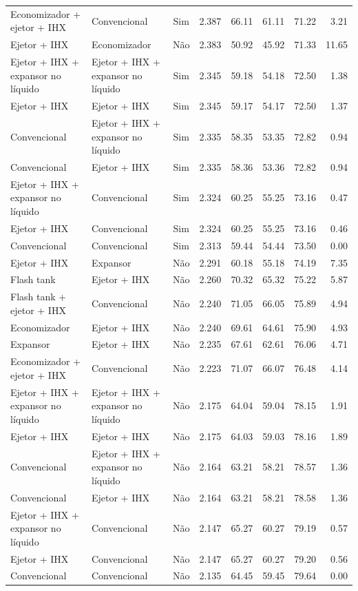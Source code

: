 {\begin{tabular}{llcrrrrr}
Economizador + ejetor + IHX & Convencional & Sim & 2.387 & 66.11 & 61.11 & 71.22 & 3.21 \\
Ejetor + IHX & Economizador & Não & 2.383 & 50.92 & 45.92 & 71.33 & 11.65 \\
Ejetor + IHX + expansor no líquido & Ejetor + IHX + expansor no líquido & Sim & 2.345 & 59.18 & 54.18 & 72.50 & 1.38 \\
Ejetor + IHX & Ejetor + IHX & Sim & 2.345 & 59.17 & 54.17 & 72.50 & 1.37 \\
Convencional & Ejetor + IHX + expansor no líquido & Sim & 2.335 & 58.35 & 53.35 & 72.82 & 0.94 \\
Convencional & Ejetor + IHX & Sim & 2.335 & 58.36 & 53.36 & 72.82 & 0.94 \\
Ejetor + IHX + expansor no líquido & Convencional & Sim & 2.324 & 60.25 & 55.25 & 73.16 & 0.47 \\
Ejetor + IHX & Convencional & Sim & 2.324 & 60.25 & 55.25 & 73.16 & 0.46 \\
Convencional & Convencional & Sim & 2.313 & 59.44 & 54.44 & 73.50 & 0.00 \\
Ejetor + IHX & Expansor & Não & 2.291 & 60.18 & 55.18 & 74.19 & 7.35 \\
Flash tank & Ejetor + IHX & Não & 2.260 & 70.32 & 65.32 & 75.22 & 5.87 \\
Flash tank + ejetor + IHX & Convencional & Não & 2.240 & 71.05 & 66.05 & 75.89 & 4.94 \\
Economizador & Ejetor + IHX & Não & 2.240 & 69.61 & 64.61 & 75.90 & 4.93 \\
Expansor & Ejetor + IHX & Não & 2.235 & 67.61 & 62.61 & 76.06 & 4.71 \\
Economizador + ejetor + IHX & Convencional & Não & 2.223 & 71.07 & 66.07 & 76.48 & 4.14 \\
Ejetor + IHX + expansor no líquido & Ejetor + IHX + expansor no líquido & Não & 2.175 & 64.04 & 59.04 & 78.15 & 1.91 \\
Ejetor + IHX & Ejetor + IHX & Não & 2.175 & 64.03 & 59.03 & 78.16 & 1.89 \\
Convencional & Ejetor + IHX + expansor no líquido & Não & 2.164 & 63.21 & 58.21 & 78.57 & 1.36 \\
Convencional & Ejetor + IHX & Não & 2.164 & 63.21 & 58.21 & 78.58 & 1.36 \\
Ejetor + IHX + expansor no líquido & Convencional & Não & 2.147 & 65.27 & 60.27 & 79.19 & 0.57 \\
Ejetor + IHX & Convencional & Não & 2.147 & 65.27 & 60.27 & 79.20 & 0.56 \\
Convencional & Convencional & Não & 2.135 & 64.45 & 59.45 & 79.64 & 0.00 \\
\bottomrule
\end{tabular}
}
